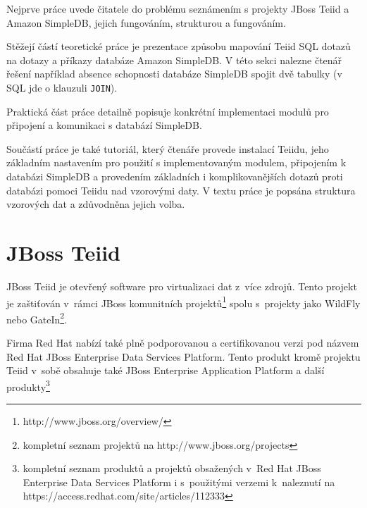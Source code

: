 \documentclass[oneside,12pt,final]{fithesis2}
\begin{document}
Nejprve práce uvede čitatele do problému seznámením s projekty JBoss Teiid a Amazon SimpleDB, jejich fungováním, strukturou a fungováním.

Stěžejí částí teoretické práce je prezentace způsobu mapování Teiid SQL dotazů na dotazy a příkazy databáze Amazon SimpleDB. V této sekci nalezne čtenář řešení například absence schopnosti databáze SimpleDB spojit dvě tabulky (v SQL jde o klauzuli \texttt{JOIN}).

Praktická část práce detailně popisuje konkrétní implementaci modulů pro připojení a komunikaci s databází SimpleDB. 

Součástí práce je také tutoriál, který čtenáře provede instalací Teiidu, jeho základním nastavením pro použití s implementovaným modulem, připojením k databázi SimpleDB a provedením základních i komplikovanějších dotazů proti databázi pomoci Teiidu nad vzorovými daty. V textu práce je popsána struktura vzorových dat a zdůvodněna jejich volba.


\chapter{JBoss Teiid}
JBoss Teiid je otevřený software pro virtualizaci dat z~více zdrojů. Tento projekt je zaštiťován v~rámci JBoss komunitních projektů\footnote{http://www.jboss.org/overview/} spolu s~projekty jako WildFly nebo GateIn\footnote{kompletní seznam projektů na http://www.jboss.org/projects}.

Firma Red Hat nabízí také plně podporovanou a certifikovanou verzi pod názvem Red Hat JBoss Enterprise Data Services Platform. Tento produkt kromě projektu Teiid v~sobě obsahuje také JBoss Enterprise Application Platform a další produkty\footnote{kompletní seznam produktů a projektů obsažených v~Red Hat JBoss Enterprise Data Services Platform i s~použitými verzemi k~naleznutí na https://access.redhat.com/site/articles/112333}
\end{document}
